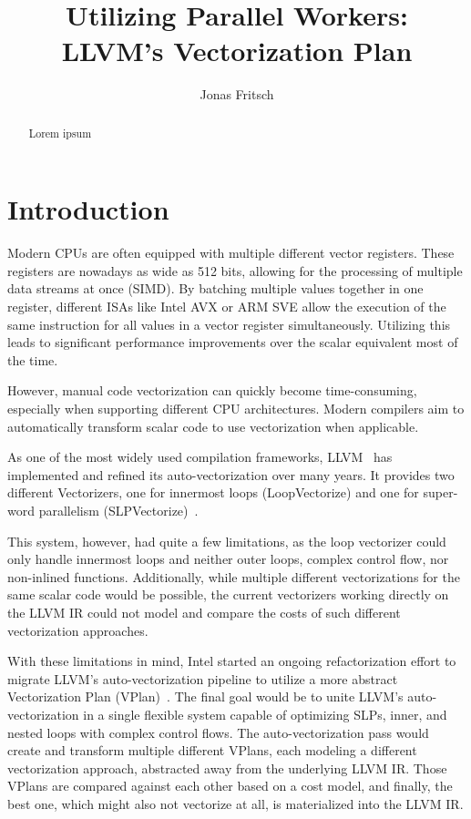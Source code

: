 \documentclass[sigplan,11pt,nonacm]{acmart}
\begin{document}
\title{Utilizing Parallel Workers: \\LLVM's Vectorization Plan}
\author{Jonas Fritsch}

\begin{abstract}
Lorem ipsum
\end{abstract}

\maketitle



\section{Introduction}
\label{sec:introduction}
Modern CPUs are often equipped with multiple different vector registers. These registers are nowadays 
as wide as 512 bits, allowing for the processing of multiple data streams at once (SIMD). By 
batching multiple values together in one register, different ISAs like Intel AVX or ARM SVE allow 
the execution of the same instruction for all values in a vector register simultaneously. 
Utilizing this leads to significant performance improvements over the scalar equivalent most of 
the time.

However, manual code vectorization can quickly become time-consuming, especially when
supporting different CPU architectures. Modern compilers aim to automatically transform scalar code
to use vectorization when applicable.

As one of the most widely used compilation frameworks, LLVM~\cite{10.5555/977395.977673} has 
implemented and refined its auto-vectorization over many years. It provides two different 
Vectorizers, one for innermost loops (LoopVectorize) and one for super-word parallelism 
(SLPVectorize)~\cite{llvmvec}.

This system, however, had quite a few limitations, as the loop vectorizer could only handle
innermost loops and neither outer loops, complex control flow, nor non-inlined functions. 
Additionally, while multiple different vectorizations for the same scalar code 
would be possible, the current vectorizers working directly on the LLVM IR could not model
and compare the costs of such different vectorization approaches.

With these limitations in mind, Intel started an ongoing refactorization effort to migrate LLVM's
auto-vectorization pipeline to utilize a more abstract Vectorization Plan 
(VPlan)~\cite{llvmextloopvec,llvmvplan}. The final goal would be to unite LLVM's auto-vectorization
in a single flexible system capable of optimizing SLPs, inner, and nested loops with complex 
control flows. The auto-vectorization pass would create and transform multiple different 
VPlans, each modeling a different vectorization approach, abstracted away from the underlying LLVM IR.
Those VPlans are compared against each other based on a cost model, and finally, the best one, which
might also not vectorize at all, is materialized into the LLVM IR.
\end{document}
